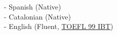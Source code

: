 \section*{\faCommenting} \label{sec:languages}
 {}

{
    \raggedright
    - Spanish (Native) \\
    - Catalonian (Native) \\
    - English (Fluent,
    \href{https://upvedues-my.sharepoint.com/:b:/g/personal/angibo2_upv_edu_es/EfpKlOKvzn1GlsNVsejwsHMB-4n1z00U9Z1Rra9upJHNBg?e=f1LV5Z}{TOEFL
    99 IBT}) \\
}